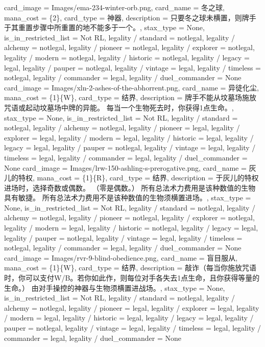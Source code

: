 \documentclass[lang = cn, color = black, 10pt]{AllThatStax}
\begin{document}
\card
{
	card_image = Images/ema-234-winter-orb.png,
	card_name = 冬之球,
	mana_cost = \{2\},
	card_type = 神器,
	description = 只要冬之球未横置，则牌手于其重置步骤中所重置的地不能多于一个。,
	stax_type = None,
	is_in_restricted_list = Not RL,
	legality / standard = notlegal,
	legality / alchemy = notlegal,
	legality / pioneer = notlegal,
	legality / explorer = notlegal,
	legality / modern = notlegal,
	legality / historic = notlegal,
	legality / legacy = legal,
	legality / pauper = notlegal,
	legality / vintage = legal,
	legality / timeless = notlegal,
	legality / commander = legal,
	legality / duel_commander = None
}
\card
{
	card_image = Images/xln-2-ashes-of-the-abhorrent.png,
	card_name = 异徒化尘,
	mana_cost = \{1\}\{W\},
	card_type = 结界,
	description = 牌手不能从坟墓场施放咒语或起动坟墓场中牌的异能。
	每当一个生物死去时，你获得1点生命。,
	stax_type = None,
	is_in_restricted_list = Not RL,
	legality / standard = notlegal,
	legality / alchemy = notlegal,
	legality / pioneer = legal,
	legality / explorer = legal,
	legality / modern = legal,
	legality / historic = legal,
	legality / legacy = legal,
	legality / pauper = notlegal,
	legality / vintage = legal,
	legality / timeless = legal,
	legality / commander = legal,
	legality / duel_commander = None
}
\card
{
	card_image = Images/lrw-150-ashling-s-prerogative.png,
	card_name = 灰儿的特权,
	mana_cost = \{1\}\{R\},
	card_type = 结界,
	description = 于灰儿的特权进场时，选择奇数或偶数。 （零是偶数。）
	所有总法术力费用是该种数值的生物具有敏捷。
	所有总法术力费用不是该种数值的生物须横置进场。,
	stax_type = None,
	is_in_restricted_list = Not RL,
	legality / standard = notlegal,
	legality / alchemy = notlegal,
	legality / pioneer = notlegal,
	legality / explorer = notlegal,
	legality / modern = legal,
	legality / historic = notlegal,
	legality / legacy = legal,
	legality / pauper = notlegal,
	legality / vintage = legal,
	legality / timeless = notlegal,
	legality / commander = legal,
	legality / duel_commander = None
}
\card
{
	card_image = Images/rvr-9-blind-obedience.png,
	card_name = 盲目服从,
	mana_cost = \{1\}\{W\},
	card_type = 结界,
	description = 敲诈（每当你施放咒语时，你可以支付{W/B}。若你如此作，则每位对手各失去1点生命，且你获得等量的生命。）
	由对手操控的神器与生物须横置进战场。,
	stax_type = None,
	is_in_restricted_list = Not RL,
	legality / standard = notlegal,
	legality / alchemy = notlegal,
	legality / pioneer = legal,
	legality / explorer = legal,
	legality / modern = legal,
	legality / historic = legal,
	legality / legacy = legal,
	legality / pauper = notlegal,
	legality / vintage = legal,
	legality / timeless = legal,
	legality / commander = legal,
	legality / duel_commander = None
}
\end{document}
